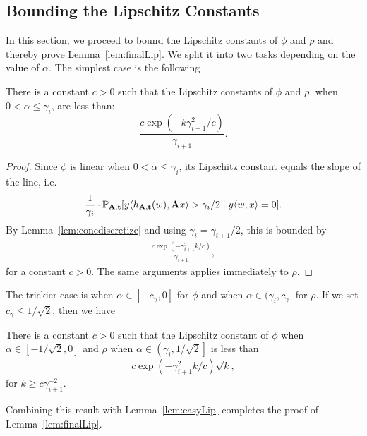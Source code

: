 \subsection{Bounding the Lipschitz Constants}
\label{sec:lip}
In this section, we proceed to bound the Lipschitz constants of $\phi$ and $\rho$ and thereby prove Lemma~\ref{lem:finalLip}.
We  split it into two tasks depending on the value of $\alpha$. The simplest case is the following
\begin{lemma}
\label{lem:easyLip}
There is a constant $c>0$ such that the Lipschitz constants of $\phi$ and $\rho$, when $0 < \alpha \leq \gamma_i$, are less than:
\[
\frac{c \exp(-k\gamma_{i+1}^2/c)}{\gamma_{i+1}}.
\]
\end{lemma}

\begin{proof}
Since $\phi$ is linear when $0 < \alpha \leq \gamma_i$, its Lipschitz constant equals the slope of the line, i.e.
\begin{align*}
\frac{1}{\gamma_i} \cdot \mathbb{P}_{\mathbf{A},\mathbf{t}}[y \langle h_{\mathbf{A},\mathbf{t}}(w),\mathbf{A} x\rangle > \gamma_i/2 \mid  y\langle w,x \rangle = 0].
\end{align*}
By Lemma~\ref{lem:concdiscretize} and using $\gamma_i = \gamma_{i+1}/2$, this is bounded by
\begin{align*}
    \frac{c\exp(-\gamma_{i+1}^2 k/c)}{\gamma_{i+1}},
\end{align*}
for a constant $c>0$. The same arguments applies immediately to $\rho$.
\end{proof}
The trickier case is when $\alpha \in [-c_\gamma, 0]$ for $\phi$ and when $\alpha \in (\gamma_i, c_\gamma]$ for $\rho$. If we set $c_\gamma \leq 1/\sqrt{2}$, then we have
\begin{lemma}\label{lem:PhiLips}
    There is a constant $c>0$ such that the Lipschitz constant of $\phi$ when $\alpha\in [-1/\sqrt{2}, 0]$ and $\rho$ when $\alpha\in \left(\gamma_i,1/\sqrt{2}\right]$ is less than
    $$ c\exp\left(-\gamma_{i+1}^2 k/c\right)\sqrt{k},$$
    for $k\ge c \gamma_{i+1}^{-2}$.
\end{lemma}
Combining this result with Lemma~\ref{lem:easyLip} completes the proof of Lemma~\ref{lem:finalLip}.


